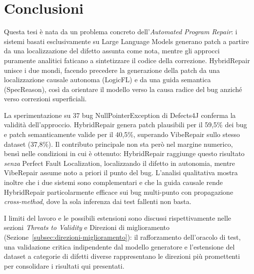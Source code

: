\section{Conclusioni}

Questa tesi è nata da un problema concreto dell'\emph{Automated Program Repair}: i sistemi
basati esclusivamente su Large Language Models generano patch a partire da una localizzazione
del difetto assunta come nota, mentre gli approcci puramente analitici faticano a sintetizzare
il codice della correzione. HybridRepair unisce i due mondi, facendo precedere la generazione
della patch da una localizzazione causale autonoma (LogicFL) e da una guida semantica
(SpecReason), così da orientare il modello verso la causa radice del bug anziché verso
correzioni superficiali.

La sperimentazione su 37 bug NullPointerException di Defects4J conferma la validità
dell'approccio. HybridRepair genera patch plausibili per il 59,5\% dei bug e patch
semanticamente valide per il 40,5\%, superando VibeRepair sullo stesso dataset (37,8\%).
Il contributo principale non sta però nel margine numerico, bensì nelle condizioni in cui è
ottenuto: HybridRepair raggiunge questo risultato \emph{senza} Perfect Fault Localization,
localizzando il difetto in autonomia, mentre VibeRepair assume noto a priori il punto del bug.
L'analisi qualitativa mostra inoltre che i due sistemi sono complementari e che la guida
causale rende HybridRepair particolarmente efficace sui bug multi-punto con propagazione
\emph{cross-method}, dove la sola inferenza dai test fallenti non basta.

I limiti del lavoro e le possibili estensioni sono discussi rispettivamente nelle sezioni
\emph{Threats to Validity} e Direzioni di miglioramento (Sezione~\ref{subsec:direzioni-miglioramento}):
il rafforzamento dell'oracolo di test, una validazione critica indipendente dal modello
generatore e l'estensione del dataset a categorie di difetti diverse rappresentano le direzioni
più promettenti per consolidare i risultati qui presentati.